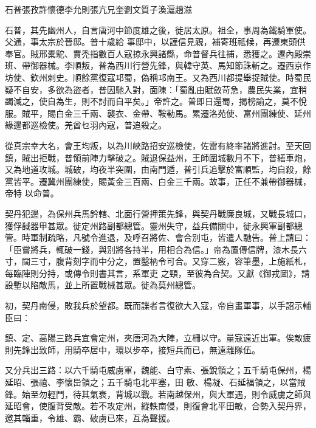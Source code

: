 
\begin{pinyinscope}

 石普張孜許懷德李允則張亢兄奎劉文質子渙滬趙滋



 石普，其先幽州人，自言唐河中節度雄之後，徙居太原。祖全，事周為鐵騎軍使。父通，事太宗於晉邸。普十歲給
 事邸中，以謹信見親，補寄班祗候，再遷東頭供奉官。賊邢橐駝、賈禿指數百人寇掠永興諸縣，命普督兵往捕，悉獲之。遷內殿崇班、帶御器械。李順叛，普為西川行營先鋒，與韓守英、馬知節誅斬之。遷西京作坊使、欽州刺史。順餘黨復寇邛蜀，偽稱邛南王。又為西川都提舉捉賊使。時蜀民疑不自安，多欲為盜者，普因馳入對，面陳：「蜀亂由賦斂苛急，農民失業，宜稍蠲減之，使自為生，則不討而自平矣。」帝許之。普即日還蜀，揭榜諭之，莫不悅
 服。賊平，賜白金三千兩、襲衣、金帶、鞍勒馬。累遷洛苑使、富州團練使、延州緣邊都巡檢使。羌酋乜羽內寇，普追殺之。



 從真宗幸大名，會王均叛，以為川峽路招安巡檢使，佐雷有終率諸將進討。至天回鎮，賊出拒戰，普領前陣力擊破之。賊退保益州，王師圍城數月不下，普繕車炮，又為地道攻城。城破，均夜半突圍，由南門遁，普引兵追擊於富順監，均自殺，餘黨皆平。遷冀州團練使，賜黃金三百兩、白金三千兩。故事，正任不兼帶御器械，帝特
 以命普。



 契丹犯邊，為保州兵馬鈐轄、北面行營押策先鋒，與契丹戰廉良城，又戰長城口，獲俘馘器甲甚眾。徙定州路副都總管。靈州失守，益兵備關中，徙永興軍副都總管。時軍制疏略，凡號令進退，及呼召將佐、會合別屯，皆遣人馳告。普上請曰：「臣嘗將兵，輒破一錢，與別將各持半，用相合為信。」帝為置傳信牌，漆木長六寸，闊三寸，腹背刻字而中分之，置鑿枘令可合。又穿二竅，容筆墨，上施紙札，每臨陣則分持，或傳令則書其言，系軍吏
 之頸，至彼為合契。又獻《御戎圖》，請設塹以陷敵馬，並上所置戰械甚眾。徙為莫州總管。



 初，契丹南侵，敗我兵於望都。既而諜者言復欲大入寇，帝自畫軍事，以手詔示輔臣曰：



 鎮、定、高陽三路兵宜會定州，夾唐河為大陣，立柵以守。量寇遠近出軍。俟敵疲則先鋒出致師，用騎卒居中，環以步卒，接短兵而已，無遠離隊伍。



 又分兵出三路：以六千騎屯威虜軍，魏能、白守素、張銳領之；五千騎屯保州，楊延昭、張禧、李懷岊領之；五千騎屯北平塞，田
 敏、楊凝、石延福領之，以當賊鋒。始至勿輕鬥，待其氣衰，背城以戰。若南越保州，與大軍遇，則令威虜之師與延昭會，使腹背受敵。若不攻定州，縱軼南侵，則復會北平田敏，合勢入契丹界，邀其輜重，令雄、霸、破虜已來，互為聲援。




\end{pinyinscope}
